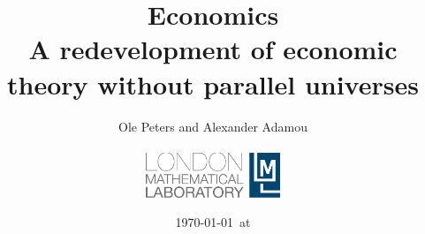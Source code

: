 


\title{Economics\\
\large{A redevelopment of economic theory without parallel universes}}
\author{Ole Peters and Alexander Adamou\\
\vspace{10cm}\\
\includegraphics[width=0.3\textwidth]{./lml_LOGO_whiteBG-eps-converted-to.pdf}}


\date{\today ~at \currenttime }

\maketitle
\newpage

\tableofcontents
\newpage






\FloatBarrier
\printnoidxglossaries




